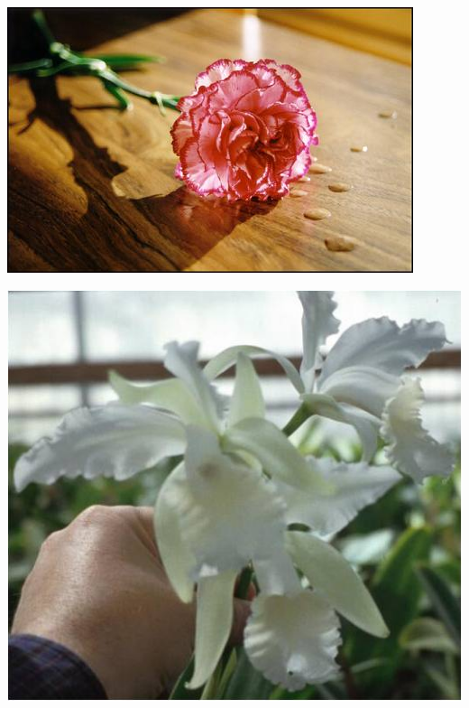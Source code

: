 \documentclass{article}
\begin{document}
\begin{center}
\includegraphics[height=0.9\textheight, angle=90]{../Carnation.jpg}
\end{center}
\newpage

\begin{center}
\includegraphics[height=0.9\textheight, angle=90]{../Cattleya.jpg}
\end{center}
\newpage
\end{document}
